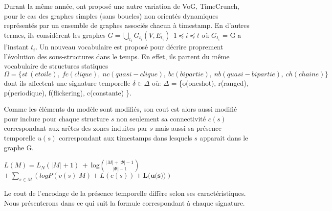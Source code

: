 Durant la même année, \citep{shah2015timecrunch} ont proposé une autre variation de VoG, TimeCrunch, pour le cas des graphes simples (sans boucles) non orientés dynamiques représentés par un ensemble de graphes associés chacun à timestamp. En d'autres termes, ils considèrent les graphes $\displaystyle{G=\bigcup_{t_{i}}G_{t_{i}}(V,E_{t_{i}})}\ \ 1 \preceq i \preceq t$ où $G_{t_{i}}$ = G a l'instant $t_{i}$.
			Un nouveau vocabulaire est proposé pour décrire proprement l'évolution des sous-structures dans le temps. En effet, ils partent du même vocabulaire de structures statiques 
			$\Omega =\{ st\ (etoile),\ fc (clique),\ nc (quasi-clique),\ bc (bipartie),\ nb (quasi-bipartie),\ ch (chaine)\}$ 
			dont ils affectent une signature temporelle $\delta \in \Delta$ où: $\Delta$ = \{o(oneshot), r(ranged), p(periodique), f(flickering), c(constante) \}. 
			
			 Comme les éléments du modèle sont modifiés, son cout est alors aussi modifié pour inclure pour chaque structure $s$ non seulement sa connectivité $c(s)$ correspondant aux arêtes des zones induites par $s$ mais aussi sa présence temporelle $u(s)$ correspondant aux timestamps dans lesquels $s$ apparait dans le graphe G. 
			 
			 $L(M) = L_{N}(|M|+1)\ +\ $log${|M|+|\Phi|-1}\choose{|\Phi|-1}$ $+\ \displaystyle{\sum_{s\in M}(logP(v(s)|M) + L(c(s)) + \textbf{L(u(s))})}$
			 
			 Le cout de l'encodage de la présence temporelle diffère selon ses caractéristiques. Nous présenterons dans ce qui suit la formule correspondant à chaque signature.

